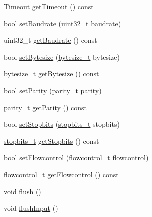 \begin{DoxyCompactItemize}
\item 
\hyperlink{structserial_1_1_timeout}{Timeout} \hyperlink{classserial_1_1_serial_a13023f118c75b27fa2f0280d2d1c2a20}{get\+Timeout} () const 
\item 
bool \hyperlink{classserial_1_1_serial_a05085fc22adee665698bdfd9b7b9783f}{set\+Baudrate} (uint32\+\_\+t baudrate)
\item 
uint32\+\_\+t \hyperlink{classserial_1_1_serial_a7a6ca1f8d8e68742e95b7f8dc8e9a1fa}{get\+Baudrate} () const 
\item 
bool \hyperlink{classserial_1_1_serial_a8adf3dcd68fb1b85ce30c8b443e5868a}{set\+Bytesize} (\hyperlink{namespaceserial_a00b3281fa11cea770c0b0c8a106080f8}{bytesize\+\_\+t} bytesize)
\item 
\hyperlink{namespaceserial_a00b3281fa11cea770c0b0c8a106080f8}{bytesize\+\_\+t} \hyperlink{classserial_1_1_serial_ac735ef88a54659e2d0b3ae674c5f0a41}{get\+Bytesize} () const 
\item 
bool \hyperlink{classserial_1_1_serial_af471db5d3a89128430e7e3c5389cd08a}{set\+Parity} (\hyperlink{namespaceserial_a8f45d26bf7c9a06659e75b5004a50481}{parity\+\_\+t} parity)
\item 
\hyperlink{namespaceserial_a8f45d26bf7c9a06659e75b5004a50481}{parity\+\_\+t} \hyperlink{classserial_1_1_serial_a80e5d87b1e93b4c5a9d6f2cc7110b3c4}{get\+Parity} () const 
\item 
bool \hyperlink{classserial_1_1_serial_a0c690a31516cd11c521ba3aff4bafc4e}{set\+Stopbits} (\hyperlink{namespaceserial_af5b116611d6628a3aa8f788fdc09f469}{stopbits\+\_\+t} stopbits)
\item 
\hyperlink{namespaceserial_af5b116611d6628a3aa8f788fdc09f469}{stopbits\+\_\+t} \hyperlink{classserial_1_1_serial_a81ee96ec2fdb80d1851430d9e2c4698b}{get\+Stopbits} () const 
\item 
bool \hyperlink{classserial_1_1_serial_a76e56ce22e2706b8954a1dc9c5188c92}{set\+Flowcontrol} (\hyperlink{namespaceserial_a93ef57a314b4e562f9eded6c15d34351}{flowcontrol\+\_\+t} flowcontrol)
\item 
\hyperlink{namespaceserial_a93ef57a314b4e562f9eded6c15d34351}{flowcontrol\+\_\+t} \hyperlink{classserial_1_1_serial_ad793526755625a59a0bf9d4cc0ea1755}{get\+Flowcontrol} () const 
\item 
void \hyperlink{classserial_1_1_serial_a45a7676a6e6c775cd549e889e714b5bb}{flush} ()
\item 
void \hyperlink{classserial_1_1_serial_aa7432cbada95a7eac6d71a107cf2eaa3}{flush\+Input} ()
\item 

\end{DoxyCompactItemize}
